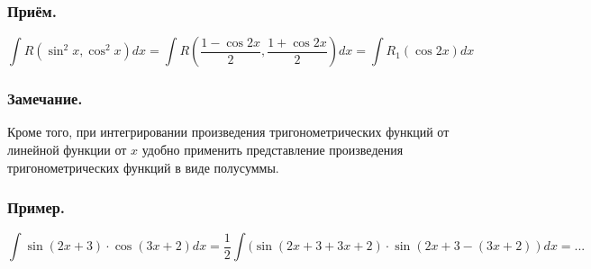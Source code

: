 \subsubsection{Приём.}
$$\int R(\sin^2 x, \cos^2 x) dx =\int R(\frac{1-\cos 2x}{2},\frac{1+\cos 2x}{2})dx=\int R_1(\cos 2x)dx$$

\subsubsection{Замечание.}
Кроме того, при интегрировании произведения тригонометрических функций от линейной функции от $x$ удобно применить представление произведения тригонометрических функций в виде полусуммы.

\subsubsection{Пример.}
$$\int \sin (2x+3) \cdot \cos(3x+2) dx=\frac{1}{2}\int(\sin(2x+3+3x+2) \cdot \sin(2x+3-(3x+2))dx=...$$



